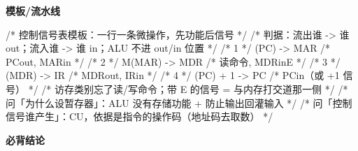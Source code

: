 \documentclass[10pt,a4paper]{ctexart}
\begin{document}
\textbf{模板/流水线}

\begin{codebox}
/* 控制信号表模板：一行一条微操作，先功能后信号 */
/* 判据：流出谁 -> 谁 out；流入谁 -> 谁 in；ALU 不进 out/in 位置 */
/* 1 */ (PC) -> MAR        /* PCout, MARin          */
/* 2 */ M(MAR) -> MDR      /* 读命令, MDRinE        */
/* 3 */ (MDR) -> IR        /* MDRout, IRin          */
/* 4 */ (PC) + 1 -> PC     /* PCin（或 +1 信号）    */
/* 访存类别忘了读/写命令；带 E 的信号 = 与内存打交道那一侧 */
/* 问「为什么设暂存器」：ALU 没有存储功能 + 防止输出回灌输入 */
/* 问「控制信号谁产生」：CU，依据是指令的操作码（地址码去取数） */
\end{codebox}




\textbf{必背结论}
\end{document}
